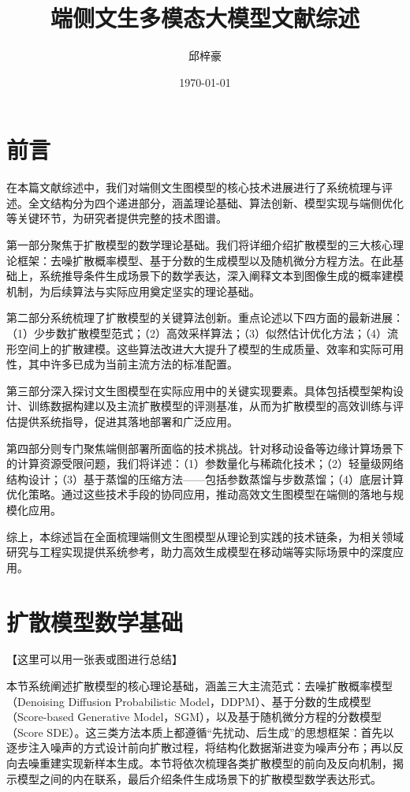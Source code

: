 \documentclass[11pt,a4paper,UTF8]{ctexart}
\title{端侧文生多模态大模型文献综述}
\author{邱梓豪}
\date{\today}
\begin{document}
\maketitle
\tableofcontents
\newpage

\section{前言}

在本篇文献综述中，我们对端侧文生图模型的核心技术进展进行了系统梳理与评述。全文结构分为四个递进部分，涵盖理论基础、算法创新、模型实现与端侧优化等关键环节，为研究者提供完整的技术图谱。

第一部分聚焦于扩散模型的数学理论基础。我们将详细介绍扩散模型的三大核心理论框架：去噪扩散概率模型、基于分数的生成模型以及随机微分方程方法。在此基础上，系统推导条件生成场景下的数学表达，深入阐释文本到图像生成的概率建模机制，为后续算法与实际应用奠定坚实的理论基础。

第二部分系统梳理了扩散模型的关键算法创新。重点论述以下四方面的最新进展：（1）少步数扩散模型范式；（2）高效采样算法；（3）似然估计优化方法；（4）流形空间上的扩散建模。这些算法改进大大提升了模型的生成质量、效率和实际可用性，其中许多已成为当前主流方法的标准配置。

第三部分深入探讨文生图模型在实际应用中的关键实现要素。具体包括模型架构设计、训练数据构建以及主流扩散模型的评测基准，从而为扩散模型的高效训练与评估提供系统指导，促进其落地部署和广泛应用。

第四部分则专门聚焦端侧部署所面临的技术挑战。针对移动设备等边缘计算场景下的计算资源受限问题，我们将详述：（1）参数量化与稀疏化技术；（2）轻量级网络结构设计；（3）基于蒸馏的压缩方法——包括参数蒸馏与步数蒸馏；（4）底层计算优化策略。通过这些技术手段的协同应用，推动高效文生图模型在端侧的落地与规模化应用。

综上，本综述旨在全面梳理端侧文生图模型从理论到实践的技术链条，为相关领域研究与工程实现提供系统参考，助力高效生成模型在移动端等实际场景中的深度应用。

\newpage

\section{扩散模型数学基础}

【这里可以用一张表或图进行总结】

本节系统阐述扩散模型的核心理论基础，涵盖三大主流范式：去噪扩散概率模型（Denoising Diffusion Probabilistic Model，DDPM）\cite{sohldickstein2015diffusion,ho2020denoising}、基于分数的生成模型（Score-based Generative Model，SGM）\cite{song2019generative,song2020improved}，以及基于随机微分方程的分数模型（Score SDE）\cite{song2020score,karras2022elucidating}。这三类方法本质上都遵循“先扰动、后生成”的思想框架：首先以逐步注入噪声的方式设计前向扩散过程，将结构化数据渐进变为噪声分布；再以反向去噪重建实现新样本生成。本节将依次梳理各类扩散模型的前向及反向机制，揭示模型之间的内在联系，最后介绍条件生成场景下的扩散模型数学表达形式。
\end{document}
